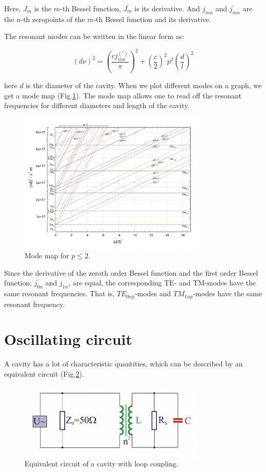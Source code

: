 \documentclass[a4paper]{article}
\numberwithin{equation}{section}
\begin{document}
Here, $J_{m}$ is the $m$-th Bessel function, $J_{m}^{'} $ is its derivative. And
$j_{mn}$ and $j_{mn}^{'}$ are the $n$-th zeropoints of the $m$-th Bessel
function and its derivative.

The resonant modes can be written in the linear form as:

\begin{equation} \label{eqn:res_freq}
		\left(d \nu \right)^2 = \left(\frac{cj_{mn}^{(')}}{\pi}\right)^2 + \left(\frac{c}{2}\right)^2 p^2 \left(\frac{d}{l}\right)^2
\end{equation}

here $d$ is the diameter of the cavity. When we plot different modes on a graph,
we get a mode map (Fig.\ref{fig:mode}). The mode map allows one to read off the
resonant frequencies for different diameters and length of the cavity. 

\begin{figure}[hbt!]
    \centering
    \includegraphics[width=0.8\textwidth]{mode_map}
	\caption{Mode map for $p \leq 2$. \cite{Switka22}}
    \label{fig:mode}
\end{figure}

Since the derivative of the zeroth order Bessel function and the first order
Bessel function, $j^{'}_{0n}$ and $j_{1n}$, are equal, the corresponding TE- and
TM-modes have the same resonant frequencies. That is, $TE_{0np}$-modes and
$TM_{1np}$-modes have the same resonant frequency. 

\section{Oscillating circuit}
A cavity has a lot of characteristic quantities, which can be described by an
equivalent circuit (Fig.\ref{fig:circuit}). 
\begin{figure}[hbt!]
    \centering
    \includegraphics[width=0.8\textwidth]{circuit}
	\caption{Equivalent circuit of a cavity with loop coupling. \cite{Switka22}}
    \label{fig:circuit}
\end{figure}	
\end{document}
